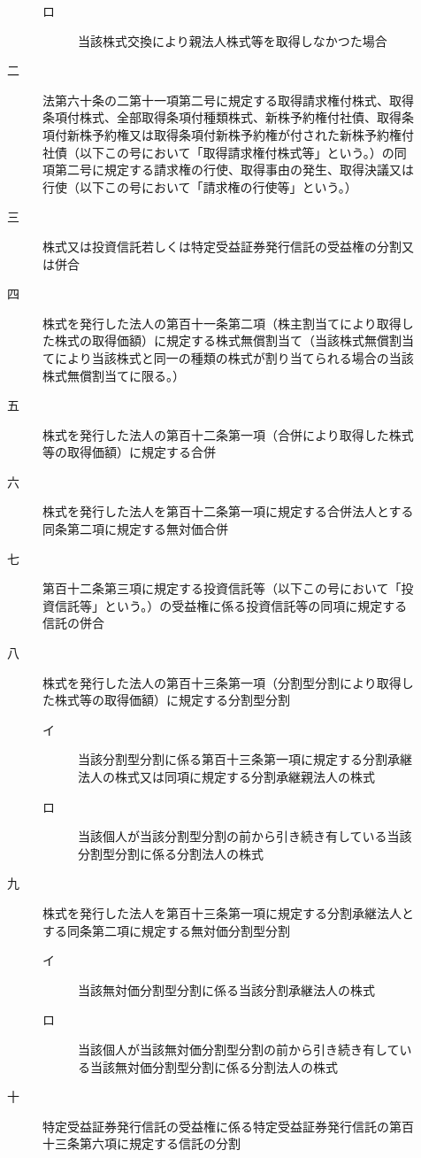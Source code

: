 \documentclass[twocolumn,a4j,10pt]{ltjtarticle}
\begin{document}
\begin{description}
\begin{description}
\begin{description}
\item[ロ]当該株式交換により親法人株式等を取得しなかつた場合
\end{description}
\item[二]法第六十条の二第十一項第二号に規定する取得請求権付株式、取得条項付株式、全部取得条項付種類株式、新株予約権付社債、取得条項付新株予約権又は取得条項付新株予約権が付された新株予約権付社債（以下この号において「取得請求権付株式等」という。）の同項第二号に規定する請求権の行使、取得事由の発生、取得決議又は行使（以下この号において「請求権の行使等」という。）
\item[三]株式又は投資信託若しくは特定受益証券発行信託の受益権の分割又は併合
\item[四]株式を発行した法人の第百十一条第二項（株主割当てにより取得した株式の取得価額）に規定する株式無償割当て（当該株式無償割当てにより当該株式と同一の種類の株式が割り当てられる場合の当該株式無償割当てに限る。）
\item[五]株式を発行した法人の第百十二条第一項（合併により取得した株式等の取得価額）に規定する合併
\item[六]株式を発行した法人を第百十二条第一項に規定する合併法人とする同条第二項に規定する無対価合併
\item[七]第百十二条第三項に規定する投資信託等（以下この号において「投資信託等」という。）の受益権に係る投資信託等の同項に規定する信託の併合
\item[八]株式を発行した法人の第百十三条第一項（分割型分割により取得した株式等の取得価額）に規定する分割型分割
\begin{description}
\item[イ]当該分割型分割に係る第百十三条第一項に規定する分割承継法人の株式又は同項に規定する分割承継親法人の株式
\item[ロ]当該個人が当該分割型分割の前から引き続き有している当該分割型分割に係る分割法人の株式
\end{description}
\item[九]株式を発行した法人を第百十三条第一項に規定する分割承継法人とする同条第二項に規定する無対価分割型分割
\begin{description}
\item[イ]当該無対価分割型分割に係る当該分割承継法人の株式
\item[ロ]当該個人が当該無対価分割型分割の前から引き続き有している当該無対価分割型分割に係る分割法人の株式
\end{description}
\item[十]特定受益証券発行信託の受益権に係る特定受益証券発行信託の第百十三条第六項に規定する信託の分割
\begin{description}

\end{description}
\end{description}
\end{description}
\end{document}
